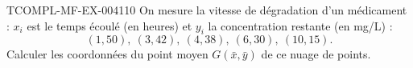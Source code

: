 \begin{exercice}{TCOMPL-MF-EX-004}{1}{10}
On mesure la vitesse de dégradation d'un médicament : $x_i$ est le temps écoulé (en heures) et $y_i$ la concentration restante (en mg/L) :
\[
  (1,50),\ (3,42),\ (4,38),\ (6,30),\ (10,15).
\]
Calculer les coordonnées du point moyen $G(\bar{x}, \bar{y})$ de ce nuage de points.
\end{exercice}
